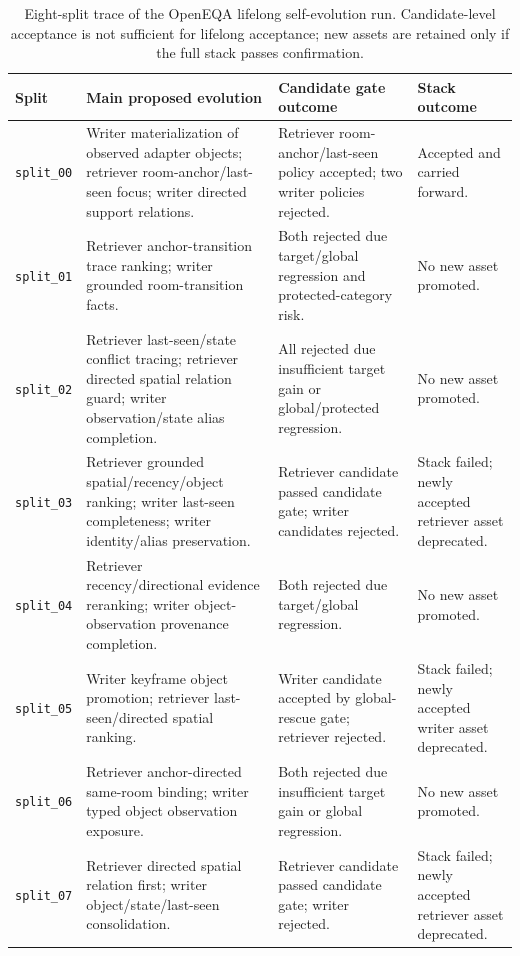\begin{table}[t]
\centering
\scriptsize
\begin{tabular}{p{} p{} p{} p{}}
\hline
\textbf{Split} & \textbf{Main proposed evolution} & \textbf{Candidate gate outcome} & \textbf{Stack outcome} \\
\hline
\texttt{split\_00}
& Writer materialization of observed adapter objects; retriever room-anchor/last-seen focus; writer directed support relations.
& Retriever room-anchor/last-seen policy accepted; two writer policies rejected.
& Accepted and carried forward. \\
\texttt{split\_01}
& Retriever anchor-transition trace ranking; writer grounded room-transition facts.
& Both rejected due target/global regression and protected-category risk.
& No new asset promoted. \\
\texttt{split\_02}
& Retriever last-seen/state conflict tracing; retriever directed spatial relation guard; writer observation/state alias completion.
& All rejected due insufficient target gain or global/protected regression.
& No new asset promoted. \\
\texttt{split\_03}
& Retriever grounded spatial/recency/object ranking; writer last-seen completeness; writer identity/alias preservation.
& Retriever candidate passed candidate gate; writer candidates rejected.
& Stack failed; newly accepted retriever asset deprecated. \\
\texttt{split\_04}
& Retriever recency/directional evidence reranking; writer object-observation provenance completion.
& Both rejected due target/global regression.
& No new asset promoted. \\
\texttt{split\_05}
& Writer keyframe object promotion; retriever last-seen/directed spatial ranking.
& Writer candidate accepted by global-rescue gate; retriever rejected.
& Stack failed; newly accepted writer asset deprecated. \\
\texttt{split\_06}
& Retriever anchor-directed same-room binding; writer typed object observation exposure.
& Both rejected due insufficient target gain or global regression.
& No new asset promoted. \\
\texttt{split\_07}
& Retriever directed spatial relation first; writer object/state/last-seen consolidation.
& Retriever candidate passed candidate gate; writer rejected.
& Stack failed; newly accepted retriever asset deprecated. \\
\hline
\end{tabular}
\caption{Eight-split trace of the OpenEQA lifelong self-evolution run. Candidate-level acceptance is not sufficient for lifelong acceptance; new assets are retained only if the full stack passes confirmation.}
\label{tab:eight_split_self_evo_trace}
\end{table}



